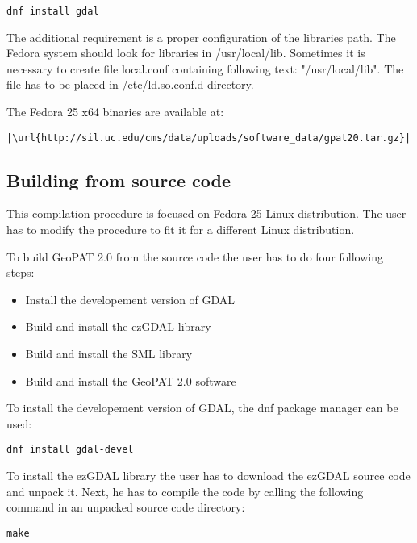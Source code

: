 \begin{lstlisting}
dnf install gdal
\end{lstlisting}

The additional requirement is a proper configuration of the libraries path.
The Fedora system should look for libraries in /usr/local/lib.
Sometimes it is necessary to create file local.conf containing following
text: "/usr/local/lib".
The file has to be placed in /etc/ld.so.conf.d directory.

The Fedora 25 x64 binaries are available at:

\begin{lstlisting}[escapechar=|]
|\url{http://sil.uc.edu/cms/data/uploads/software_data/gpat20.tar.gz}|
\end{lstlisting}

\subsection{Building from source code}

This compilation procedure is focused on Fedora 25
Linux distribution. The user has to modify the procedure
to fit it for a different Linux distribution.

To build GeoPAT 2.0 from the source code the user has to do four following steps:

\begin{itemize}
    \item{Install the developement version of GDAL}
    \item{Build and install the ezGDAL library}
    \item{Build and install the SML library}
    \item{Build and install the GeoPAT 2.0 software}
\end{itemize}

To install the developement version of GDAL, the dnf package manager can be used:

\begin{lstlisting}
dnf install gdal-devel
\end{lstlisting}

To install the ezGDAL library the user has to download the ezGDAL source
code and unpack it. Next, he has to compile the code by calling the following
command in an unpacked source code directory:

\begin{lstlisting}
make
\end{lstlisting}

